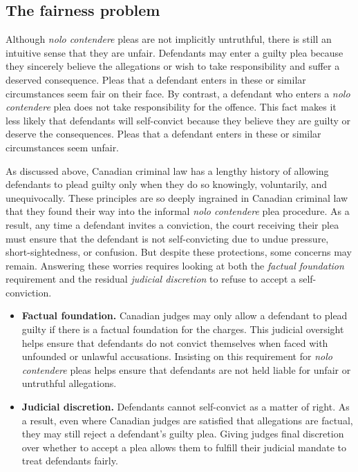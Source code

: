 \subsection{The fairness problem}

Although \textit{nolo contendere} pleas are not implicitly untruthful, there is still an intuitive sense that they are unfair. Defendants may enter a guilty plea because they sincerely believe the allegations or wish to take responsibility and suffer a deserved consequence. Pleas that a defendant enters in these or similar circumstances seem fair on their face. By contrast, a defendant who enters a \textit{nolo contendere} plea does not take responsibility for the offence. This fact makes it less likely that defendants will self-convict because they believe they are guilty or deserve the consequences. Pleas that a defendant enters in these or similar circumstances seem unfair.

As discussed above, Canadian criminal law has a lengthy history of allowing defendants to plead guilty only when they do so knowingly, voluntarily, and unequivocally. These principles are so deeply ingrained in Canadian criminal law that they found their way into the informal \textit{nolo contendere} plea procedure. As a result, any time a defendant invites a conviction, the court receiving their plea must ensure that the defendant is not self-convicting due to undue pressure, short-sightedness, or confusion. But despite these protections, some concerns may remain. Answering these worries requires looking at both the \textit{factual foundation} requirement and the residual \textit{judicial discretion} to refuse to accept a self-conviction.

\begin{itemize}
    \item \textbf{Factual foundation.} Canadian judges may only allow a defendant to plead guilty if there is a factual foundation for the charges. This judicial oversight helps ensure that defendants do not convict themselves when faced with unfounded or unlawful accusations. Insisting on this requirement for \textit{nolo contendere} pleas helps ensure that defendants are not held liable for unfair or untruthful allegations.
    \item \textbf{Judicial discretion.} Defendants cannot self-convict as a matter of right. As a result, even where Canadian judges are satisfied that allegations are factual, they may still reject a defendant's guilty plea. Giving judges final discretion over whether to accept a plea allows them to fulfill their judicial mandate to treat defendants fairly.
\end{itemize}

